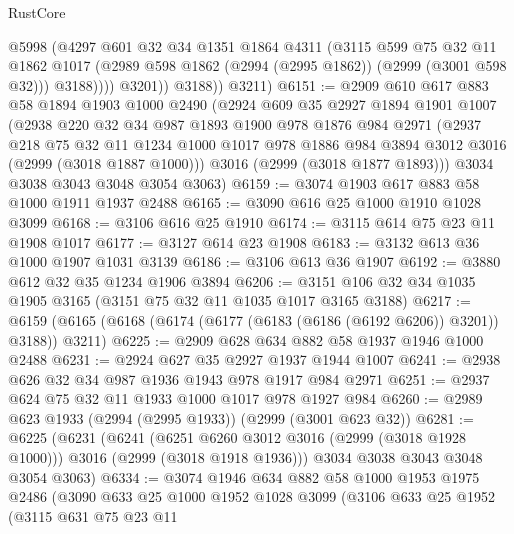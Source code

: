 \begin{lexlean}{RustCore}
\begin{coremodule}
                  @5998
                  (@4297
                    @601
                    @32
                    @34
                    @1351
                    @1864
                    @4311
                    (@3115
                      @599
                      @75
                      @32
                      @11
                      @1862
                      @1017
                      (@2989 @598 @1862 (@2994 (@2995 @1862)) (@2999 (@3001 @598 @32)))
                      @3188))))
              @3201))
          @3188))
      @3211)
@6151 := @2909
    @610
    @617
    @883
    @58
    @1894
    @1903
    @1000
    @2490
    (@2924
      @609
      @35
      @2927
      @1894
      @1901
      @1007
      (@2938
        @220
        @32
        @34
        @987
        @1893
        @1900
        @978
        @1876
        @984
        @2971
        (@2937
          @218
          @75
          @32
          @11
          @1234
          @1000
          @1017
          @978
          @1886
          @984
          @3894
          @3012
          @3016
          (@2999 (@3018 @1887 @1000)))
        @3016
        (@2999 (@3018 @1877 @1893)))
      @3034
      @3038
      @3043
      @3048
      @3054
      @3063)
@6159 := @3074 @1903 @617 @883 @58 @1000 @1911 @1937 @2488
@6165 := @3090 @616 @25 @1000 @1910 @1028 @3099
@6168 := @3106 @616 @25 @1910
@6174 := @3115 @614 @75 @23 @11 @1908 @1017
@6177 := @3127 @614 @23 @1908
@6183 := @3132 @613 @36 @1000 @1907 @1031 @3139
@6186 := @3106 @613 @36 @1907
@6192 := @3880 @612 @32 @35 @1234 @1906 @3894
@6206 := @3151 @106 @32 @34 @1035 @1905 @3165 (@3151 @75 @32 @11 @1035 @1017 @3165 @3188)
@6217 := @6159 (@6165 (@6168 (@6174 (@6177 (@6183 (@6186 (@6192 @6206)) @3201)) @3188)) @3211)
@6225 := @2909 @628 @634 @882 @58 @1937 @1946 @1000 @2488
@6231 := @2924 @627 @35 @2927 @1937 @1944 @1007
@6241 := @2938 @626 @32 @34 @987 @1936 @1943 @978 @1917 @984 @2971
@6251 := @2937 @624 @75 @32 @11 @1933 @1000 @1017 @978 @1927 @984
@6260 := @2989 @623 @1933 (@2994 (@2995 @1933)) (@2999 (@3001 @623 @32))
@6281 := @6225
    (@6231
      (@6241
        (@6251 @6260 @3012 @3016 (@2999 (@3018 @1928 @1000)))
        @3016
        (@2999 (@3018 @1918 @1936)))
      @3034
      @3038
      @3043
      @3048
      @3054
      @3063)
@6334 := @3074
    @1946
    @634
    @882
    @58
    @1000
    @1953
    @1975
    @2486
    (@3090
      @633
      @25
      @1000
      @1952
      @1028
      @3099
      (@3106
        @633
        @25
        @1952
        (@3115
          @631
          @75
          @23
          @11

\end{coremodule}
\end{lexlean}
